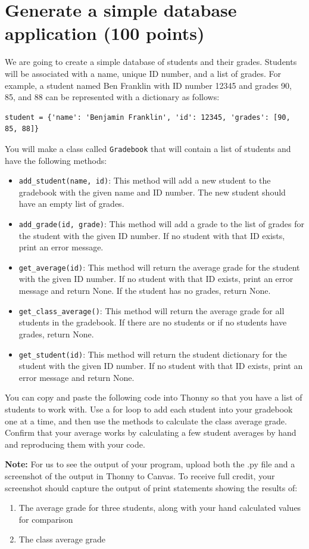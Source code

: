 \documentclass[12pt]{article}
\begin{document}
\section*{Generate a simple database application (100 points)}
We are going to create a simple database of students and their grades. Students will be associated with a name, unique ID number, and a list of grades. For example, a student named Ben Franklin with ID number 12345 and grades 90, 85, and 88 can be represented with a dictionary as follows:
\begin{verbatim}
student = {'name': 'Benjamin Franklin', 'id': 12345, 'grades': [90, 85, 88]}
\end{verbatim}
You will make a class called \texttt{Gradebook} that will contain a list of students and have the following methods:
\begin{itemize}
    \item \texttt{add\_student(name, id)}: This method will add a new student to the gradebook with the given name and ID number. The new student should have an empty list of grades.
    \item \texttt{add\_grade(id, grade)}: This method will add a grade to the list of grades for the student with the given ID number. If no student with that ID exists, print an error message.
    \item \texttt{get\_average(id)}: This method will return the average grade for the student with the given ID number. If no student with that ID exists, print an error message and return None. If the student has no grades, return None.
    \item \texttt{get\_class\_average()}: This method will return the average grade for all students in the gradebook. If there are no students or if no students have grades, return None.
    \item \texttt{get\_student(id)}: This method will return the student dictionary for the student with the given ID number. If no student with that ID exists, print an error message and return None.
\end{itemize}

You can copy and paste the following code into Thonny so that you have a list of students to work with. Use a for loop to add each student into your gradebook one at a time, and then use the methods to calculate the class average grade. Confirm that your average works by calculating a few student averages by hand and reproducing them with your code.

\textbf{Note:} For us to see the output of your program, upload both the .py file and a screenshot of the output in Thonny to Canvas. To receive full credit, your screenshot should capture the output of print statements showing the results of:
\begin{enumerate}
\item The average grade for three students, along with your hand calculated values for comparison
\item The class average grade
\end{enumerate}
\end{document}
